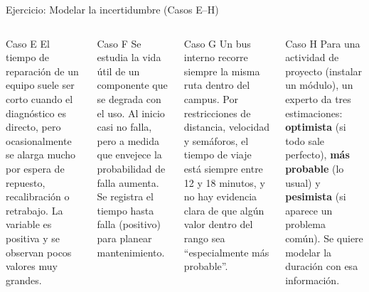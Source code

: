 \documentclass[aspectratio=1610, 9pt]{beamer}
\begin{document}
\begin{frame}{Ejercicio: Modelar la incertidumbre (Casos E--H)}
\small
\begin{columns}[T]

\begin{block}{Caso E}
El tiempo de reparación de un equipo suele ser corto cuando el diagnóstico es directo,  
pero ocasionalmente se alarga mucho por espera de repuesto, recalibración o retrabajo.  
La variable es positiva y se observan pocos valores muy grandes.
\end{block}

\begin{block}{Caso F}
Se estudia la vida útil de un componente que se degrada con el uso.  
Al inicio casi no falla, pero a medida que envejece la probabilidad de falla aumenta.  
Se registra el tiempo hasta falla (positivo) para planear mantenimiento.
\end{block}


\begin{block}{Caso G}
Un bus interno recorre siempre la misma ruta dentro del campus.  
Por restricciones de distancia, velocidad y semáforos, el tiempo de viaje está siempre entre 12 y 18 minutos, y no hay evidencia clara de que algún valor dentro del rango sea “especialmente más probable”.
\end{block}

\begin{block}{Caso H}
Para una actividad de proyecto (instalar un módulo), un experto da tres estimaciones:  
\textbf{optimista} (si todo sale perfecto), \textbf{más probable} (lo usual) y \textbf{pesimista} (si aparece un problema común).  
Se quiere modelar la duración con esa información.
\end{block}

\end{columns}
\end{frame}
\end{document}
